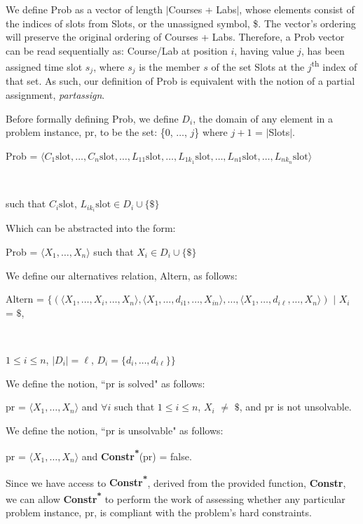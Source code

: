 \documentclass[11pt, oneside]{article}   	%
\begin{document}
\noindent We define Prob as a vector of length $\vert$Courses + Labs$\vert$, whose elements consist of the indices of slots from Slots, or the unassigned symbol, \$. The vector's ordering will preserve the original ordering of Courses + Labs. Therefore, a Prob vector can be read sequentially as: Course/Lab at position $i$, having value $j$, has been assigned time slot $s_j$, where $s_j$ is the member $s$ of the set Slots at the $j$\textsuperscript{th} index of that set. As such, our definition of Prob is equivalent with the notion of a partial assignment, \textit{partassign}.

\noindent Before formally defining Prob, we define $D_i$, the domain of any element in a problem instance, pr, to be the set: \{0, $\dots$, $j$\} where $j+1$ = $\vert$Slots$\vert$.

\noindent \centerline{Prob =  $\langle C_1 \text{slot}, \dots, C_n \text{slot}, \dots, L_{11} \text{slot}, \dots, L_{1{k_1}} \text{slot}, \dots, L_{n1} \text{slot}, \dots, L_{n{k_n}} \text{slot}\rangle$}\\
\centerline{such that $C_i \text{slot}$, $L_{i{k_i}} \text{slot} \in D_i \cup \{\$\}$}

\noindent Which can be abstracted into the form:

\noindent \centerline{Prob = $\langle X_1, \dots, X_n\rangle$ such that $X_i \in D_i \cup \{\$\}$}

\noindent We define our alternatives relation, Altern, as follows:

\noindent \centerline{Altern = $\{(\langle X_1, \dots, X_i, \dots, X_n \rangle, \langle X_1, \dots, d_{i1}, \dots, X_{in} \rangle, \dots, \langle X_1, \dots, d_{i\ell}, \dots, X_n \rangle)$ $\vert$ $X_i$ = $\$$,}\\
\centerline{$1 \le i \le n$, $\vert D_i \vert = \ell$, $D_i = \{d_i, \dots, d_{i\ell}\}\}$}

\noindent We define the notion, ``pr is solved" as follows:

\noindent \centerline{pr = $\langle X_1, \dots, X_n \rangle$ and $\forall i$ such that $1 \le i \le n$, $X_i$ $\neq$ $\$$, and pr is not unsolvable.}

\noindent We define the notion, ``pr is unsolvable" as follows:

\noindent \centerline{pr = $\langle X_1, \dots, X_n \rangle$ and \textbf{Constr\textsuperscript{*}}(pr) = false.}

\noindent Since we have access to \textbf{Constr\textsuperscript{*}}, derived from the provided function, \textbf{Constr}, we can allow \textbf{Constr\textsuperscript{*}} to perform the work of assessing whether any particular problem instance, pr, is compliant with the problem's hard constraints.
\end{document}
